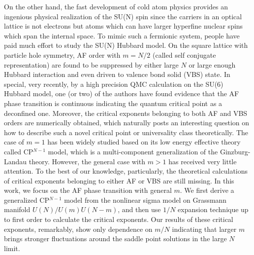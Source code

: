 \documentclass[aps,twocolumn,superscriptaddress]{revtex4-1}
\begin{document}
On the other hand, the fast development of cold atom physics provides an ingenious physical realization of the SU(N)
spin since the carriers in an optical lattice is not electrons but atoms which can have larger hyperfine nuclear spins
which span the internal space.
\cite{wu2003,*wu2005,*wu2006,honerkamp2004,taie2010,desalvo2010,krauser2012,zhang2014,hart2015} To mimic such a
fermionic system, people have paid much effort to study the SU(N) Hubbard model.
\cite{honerkamp2004,assaad2005,cai2013a,cai2013,wang2014,zhou2014,*zhou2016,*zhou2017} On the square lattice with
particle hole symmetry, AF order with $m=N/2$ (called self conjugate representation) are found to be suppressed by
either large $N$ or large enough Hubbard interaction and even driven to valence bond solid (VBS) state.
\cite{cai2013,wang2014} In special, very recently, by a high precision QMC calculation on the SU(6) Hubbard model, one
(or two) of the authors have found evidence that the AF phase transition is continuous indicating the quantum critical
point as a deconfined one. \cite{wang2014,wang2018} Moreover, the critical exponents belonging to both AF and VBS orders
are numerically obtained, which naturally posts an interesting question on how to describe such a novel critical point
or universality class theoretically. The case of $m=1$ has been widely studied based on its low energy effective theory
called CP$^{N-1}$ model, which is a multi-component generalization of the Ginzburg-Landau theory.
\cite{halperin1974,hikami1979,read1989,read1989a,starykh1994,irkhin1996,kaul2008,block2013,demidio2017} However, the
general case with $m>1$ has received very little attention. \cite{macfarlane1979,hikami1980,duerksen1981,maharana1983}
To the best of our knowledge, particularly, the theoretical calculations of critical exponents belonging to either AF or
VBS are still missing. In this work, we focus on the AF phase transition with general $m$. We first derive a generalized
CP$^{N-1}$ model from the nonlinear sigma model on Grassmann manifold $U(N)/U(m)U(N-m)$, and then use $1/N$ expansion
technique up to first order to calculate the critical exponents. Our results of these critical exponents, remarkably,
show only dependence on $m/N$ indicating that larger $m$ brings stronger fluctuations around the saddle point solutions
in the large $N$ limit.
\end{document}

